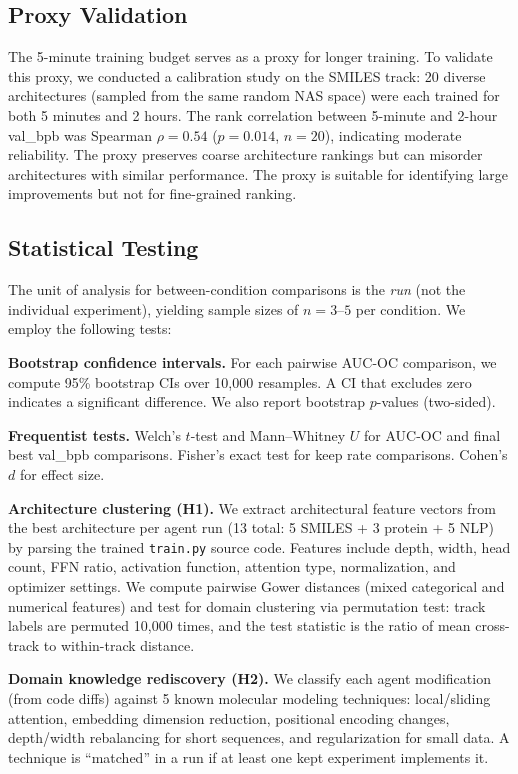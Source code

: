 \subsection{Proxy Validation}
\label{sec:proxy_validation}

The 5-minute training budget serves as a proxy for longer training. To validate this proxy, we conducted a calibration study on the SMILES track: 20 diverse architectures (sampled from the same random NAS space) were each trained for both 5 minutes and 2 hours. The rank correlation between 5-minute and 2-hour val\_bpb was Spearman $\rho = 0.54$ ($p = 0.014$, $n = 20$), indicating moderate reliability. The proxy preserves coarse architecture rankings but can misorder architectures with similar performance. The proxy is suitable for identifying large improvements but not for fine-grained ranking.

\subsection{Statistical Testing}
\label{sec:statistical_testing}

The unit of analysis for between-condition comparisons is the \emph{run} (not the individual experiment), yielding sample sizes of $n = 3$--$5$ per condition. We employ the following tests:

\textbf{Bootstrap confidence intervals.} For each pairwise AUC-OC comparison, we compute 95\% bootstrap CIs over 10{,}000 resamples. A CI that excludes zero indicates a significant difference. We also report bootstrap $p$-values (two-sided).

\textbf{Frequentist tests.} Welch's $t$-test and Mann--Whitney $U$ for AUC-OC and final best val\_bpb comparisons. Fisher's exact test for keep rate comparisons. Cohen's $d$ for effect size.

\textbf{Architecture clustering (H1).} We extract architectural feature vectors from the best architecture per agent run (13 total: 5 SMILES + 3 protein + 5 NLP) by parsing the trained \texttt{train.py} source code. Features include depth, width, head count, FFN ratio, activation function, attention type, normalization, and optimizer settings. We compute pairwise Gower distances (mixed categorical and numerical features) and test for domain clustering via permutation test: track labels are permuted 10{,}000 times, and the test statistic is the ratio of mean cross-track to within-track distance.

\textbf{Domain knowledge rediscovery (H2).} We classify each agent modification (from code diffs) against 5 known molecular modeling techniques: local/sliding attention, embedding dimension reduction, positional encoding changes, depth/width rebalancing for short sequences, and regularization for small data. A technique is ``matched'' in a run if at least one kept experiment implements it.


